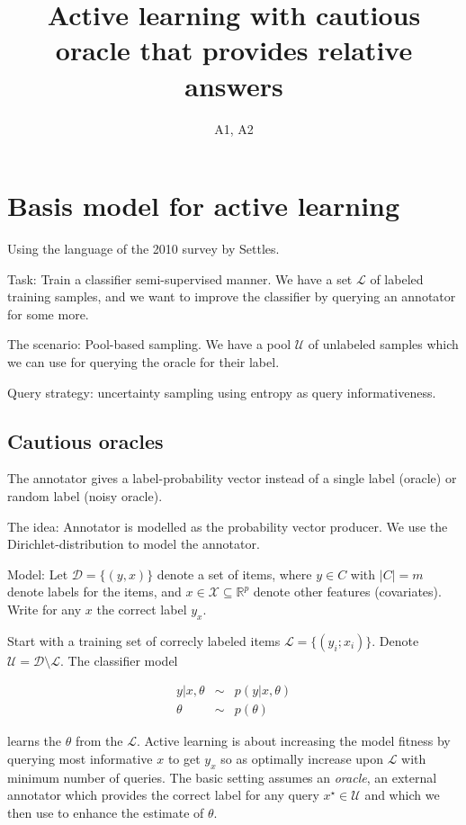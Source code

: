 \documentclass[10pt, onecolumn]{article}
\newcommand{\U}{\mathcal{U}}
\renewcommand{\L}{\mathcal{L}}
\newcommand{\newx}{{x^\star}}
\newcommand{\R}{\mathbb{R}}
\newcommand{\X}{\mathcal{X}}
\newcommand{\D}{\mathcal{D}}
\begin{document}
\title{Active learning with cautious oracle that provides relative answers}
\author{A1, A2}
\maketitle

\section{Basis model for active learning}
Using the language of the 2010 survey by Settles.

Task: Train a classifier semi-supervised manner. We have a set $\L$ of labeled training samples, and we want to improve the classifier by querying an annotator for some more.

The scenario: Pool-based sampling. We have a pool $\U$ of unlabeled samples which we can use for querying the oracle for their label.

Query strategy: uncertainty sampling using entropy as query informativeness.

\subsection{Cautious oracles}
The annotator gives a label-probability vector instead of a single label (oracle) or random label (noisy oracle).

The idea: Annotator is modelled as the probability vector producer. We use the Dirichlet-distribution to model the annotator.

Model: Let $\D=\{(y,x)\}$ denote a set of items, where $y\in C$ with $|C|=m$ denote labels for the items, and $x\in \X\subseteq \R^p$ denote other features (covariates). Write for any $x$ the correct label $y_x$. 

Start with a training set of correcly labeled items $\L=\{(y_i; x_i)\}$. Denote $\U=\D\setminus \L$. The classifier model

\begin{eqnarray}
y | x, \theta &\sim & p(y| x, \theta)\\
\theta & \sim & p(\theta)
\end{eqnarray}

learns the $\theta$ from the $\L$. Active learning is about increasing the model fitness  by querying most informative $x$ to get $y_x$ so as optimally increase upon $\L$ with minimum number of queries. The basic setting assumes an \emph{oracle}, an external annotator which provides the correct label for any query $\newx\in \U$ and which we then use to enhance the estimate of $\theta$.
\end{document}
